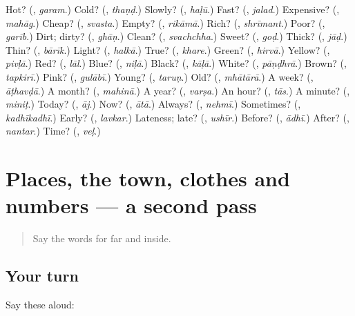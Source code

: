 \begin{tcolorbox}[breakable,colback=teal!4,colframe=teal!35!black,title={Before you move on}]
Hot? (\textbf{}, \emph{garam}.) Cold? (\textbf{}, \emph{thaṇḍ}.) Slowly? (\textbf{}, \emph{haḷū}.) Fast? (\textbf{}, \emph{jalad}.) Expensive? (\textbf{}, \emph{mahāg}.) Cheap? (\textbf{}, \emph{svasta}.) Empty? (\textbf{}, \emph{rikāmā}.) Rich? (\textbf{}, \emph{shrīmant}.) Poor? (\textbf{}, \emph{garīb}.) Dirt; dirty? (\textbf{}, \emph{ghāṇ}.) Clean? (\textbf{}, \emph{svachchha}.) Sweet? (\textbf{}, \emph{goḍ}.) Thick? (\textbf{}, \emph{jāḍ}.) Thin? (\textbf{}, \emph{bārīk}.) Light? (\textbf{}, \emph{halkā}.) True? (\textbf{}, \emph{khare}.) Green? (\textbf{}, \emph{hirvā}.) Yellow? (\textbf{}, \emph{pivḷā}.) Red? (\textbf{}, \emph{lāl}.) Blue? (\textbf{}, \emph{niḷā}.) Black? (\textbf{}, \emph{kāḷā}.) White? (\textbf{}, \emph{pāṇḍhrā}.) Brown? (\textbf{}, \emph{tapkirī}.) Pink? (\textbf{}, \emph{gulābī}.) Young? (\textbf{}, \emph{taruṇ}.) Old? (\textbf{}, \emph{mhātārā}.) A week? (\textbf{}, \emph{āṭhavḍā}.) A month? (\textbf{}, \emph{mahinā}.) A year? (\textbf{}, \emph{varṣa}.) An hour? (\textbf{}, \emph{tās}.) A minute? (\textbf{}, \emph{miniṭ}.) Today? (\textbf{}, \emph{āj}.) Now? (\textbf{}, \emph{ātā}.) Always? (\textbf{}, \emph{nehmī}.) Sometimes? (\textbf{}, \emph{kadhīkadhī}.) Early? (\textbf{}, \emph{lavkar}.) Lateness; late? (\textbf{}, \emph{ushīr}.) Before? (\textbf{}, \emph{ādhī}.) After? (\textbf{}, \emph{nantar}.) Time? (\textbf{}, \emph{veḷ}.)
\end{tcolorbox}
\section[(dialogue)]{Places, the town, clothes and numbers — a second pass}

\label{lesson:MR-R120-second-pass-places-the-town-clothes-and-numbers}



\begin{quote}
Say the words for far and inside.
\end{quote}

\subsection*{Your turn}
Say these aloud:

